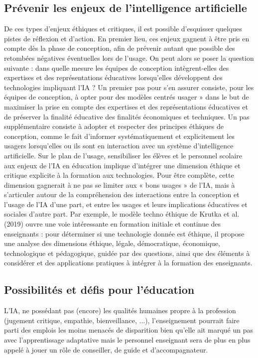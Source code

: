 \subsection{Prévenir les enjeux de l’intelligence artificielle}
	De ces types d’enjeux éthiques et critiques, il est possible d’esquisser quelques pistes de réflexion et d’action. En premier lieu, ces enjeux gagnent à être pris en compte dès la phase de conception, afin de prévenir autant que possible des retombées négatives éventuelles lors de l’usage. On peut alors se poser la question suivante : dans quelle mesure les équipes de conception intègrent-elles des expertises et des représentations éducatives lorsqu’elles développent des technologies impliquant l’IA ? Un premier pas pour s’en assurer consiste, pour les équipes de conception, à opter pour des modèles centrés usager » dans le but de maximiser la prise en compte des expertises et des représentations éducatives et de préserver la finalité éducative des finalités économiques et techniques. Un pas supplémentaire consiste à adopter et respecter des principes éthiques de conception, comme le fait d’informer systématiquement et explicitement les usagers lorsqu’elles ou ils sont en interaction avec un système d’intelligence artificielle. Sur le plan de l’usage, sensibiliser les élèves et le personnel scolaire aux enjeux de l’IA en éducation implique d’intégrer une dimension éthique et critique explicite à la formation aux technologies. Pour être complète, cette dimension gagnerait à ne pas se limiter aux « bons usages » de l’IA, mais à s’articuler autour de la compréhension des interactions entre la conception et l’usage de l’IA d’une part, et entre les usages et leurs implications éducatives et sociales d’autre part. Par exemple, le modèle techno éthique de Krutka et al. (2019) ouvre une voie intéressante en formation initiale et continue des enseignants : pour déterminer si une technologie donnée est éthique, il propose une analyse des dimensions éthique, légale, démocratique, économique, technologique et pédagogique, guidée par des questions, ainsi que des éléments à considérer et des applications pratiques à intégrer à la formation des enseignants.

\subsection{Possibilités et défis pour l’éducation}
L’IA, ne possédant pas (encore) les qualités humaines propre à la profession (jugement critique, empathie, bienveillance, ...), l’enseignement pourrait faire parti des emplois les moins menacés de disparition bien qu’elle ait marqué un pas avec l’apprentissage adaptative mais le personnel enseignant sera de plus en plus appelé à jouer un rôle de conseiller, de guide et d’accompagnateur. 


